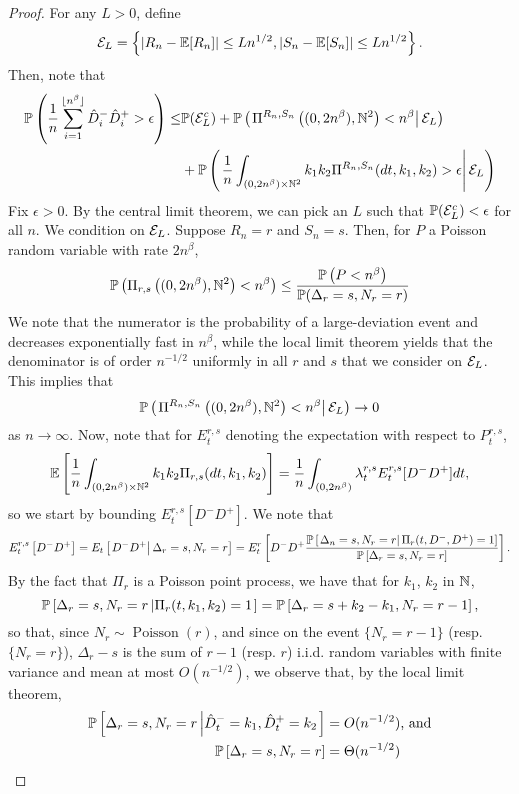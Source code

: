 \begin{proof}
For any $L>0$, define
$$\cE_L=\left\{|R_n-\E[R_n]|\leq Ln^{1/2},  |S_n-\E[S_n]|\leq Ln^{1/2}\right\}.$$
Then, note that 
\begin{align*}\P\left(\frac{1}{n}\sum_{i=1}^{\lfloor n^\beta\rfloor} \hat{D}_i^-\hat{D}_i^+>\epsilon \right)\leq & \P(\cE_L^c) + \P\left(\left.\Pi^{R_n,S_n}\left((0,2n^\beta),\N^2\right)<n^\beta\right|\cE_L \right)\\
&+\P\left(\left.\frac{1}{n}\int_{(0,2n^\beta)\times \N^2}k_1k_2 \Pi^{R_n,S_n}(dt,k_1,k_2)>\epsilon  \right|\cE_L \right)\end{align*}
Fix $\epsilon>0$. By the central limit theorem, we can pick an $L$ such that $\P(\cE_L^c)<\epsilon$ for all $n$. We condition on $\cE_L$. Suppose $R_n=r$ and $S_n=s$. Then, for $P$ a Poisson random variable with rate $2n^\beta$,
 $$\P\left(\Pi_{r,s}\left((0,2n^\beta),\N^2\right)<n^\beta\right)\leq \frac{\P\left(P<n^\beta\right)}{\P(\Delta_r=s, N_r=r)}$$
 We note that the numerator is the probability of a large-deviation event and decreases exponentially fast in $n^\beta$, while the local limit theorem yields that the denominator is of order $n^{-1/2}$ uniformly in all $r$ and $s$ that we consider on $\cE_L$. This implies that $$\P\left(\left.\Pi^{R_n,S_n}\left((0,2n^\beta),\N^2\right)<n^\beta\right|\cE_L\right)\to 0$$
as $n\to \infty$.  
Now, note that for $E^{r,s}_t$ denoting the expectation with respect to $P_t^{r,s}$,
$$\E\left[\frac{1}{n}\int_{(0,2n^\beta)\times \N^2}k_1k_2 \Pi_{r,s}(dt,k_1,k_2) \right]=\frac{1}{n}\int_{(0,2n^\beta)}\lambda^{r,s}_t E^{r,s}_t[D^- D^+]dt,$$
so we start by bounding $E^{r,s}_t[D^- D^+]$. 
We note that
$$E^{r,s}_t\left[{D}^-{D}^+\right]={E}_t\left[\left.{D}^-{D}^+\right| \Delta_r=s, N_r=r\right]={E}^r_t\left[{D}^-{D}^+\frac{\P\left[\left. \Delta_n=s, N_r=r \right|\Pi_r(t,D^-,D^+)=1\right]}{\P\left[ \Delta_r=s, N_r=r\right]}\right].$$
By the fact that $\Pi_r$ is a Poisson point process, we have that for $k_1$, $k_2$ in $\N$, 
$$\P\left[ \Delta_r=s, N_r=r \left| \Pi_r(t,k_1,k_2)=1\right.\right]=\P\left[ \Delta_r=s+k_2-k_1, N_r=r-1 \right],$$
so that, since $N_r\sim \operatorname{Poisson}(r)$, and since on the event $\{N_r=r-1\}$ (resp. $\{N_r=r\}$),  $\Delta_r-s$ is the sum of $r-1$ (resp. $r$) i.i.d. random variables with finite variance and mean at most $O(n^{-1/2})$, we observe that, by the local limit theorem,
\begin{align*}
    \P\left[ \Delta_r=s, N_r=r \left| \hat{D}^-_t=k_1,\hat{D}^+_t=k_2\right.\right]&=O(n^{-1/2})\text{, and}\\
    \P\left[ \Delta_r=s, N_r=r \right]&=\Theta(n^{-1/2})

\end{align*}
\end{proof}
